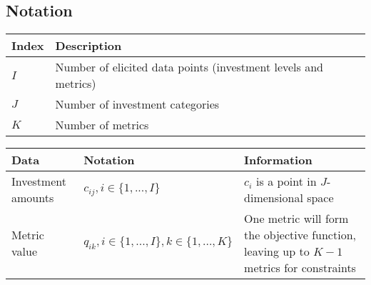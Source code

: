 \documentclass[letterpaper,10pt,english]{sphinxmanual}
\begin{document}
\subsection{Notation}
\label{\detokenize{optimizers:notation}}

\begin{savenotes}\sphinxattablestart
\centering
{}
\sphinxthecaptionisattop
{}\label{\detokenize{optimizers:table-8}}\label{\detokenize{optimizers:tbl-milpindex}}
\sphinxaftertopcaption
\begin{tabulary}{\linewidth}[t]{|T|T|}
\hline
\sphinxstyletheadfamily 
Index
&\sphinxstyletheadfamily 
Description
\\
\hline
\(I\)
&
Number of elicited data points (investment levels and metrics)
\\
\hline
\(J\)
&
Number of investment categories
\\
\hline
\(K\)
&
Number of metrics
\\
\hline
\end{tabulary}
\par
\sphinxattableend\end{savenotes}


\begin{savenotes}\sphinxattablestart
\centering
{}
\sphinxthecaptionisattop
{}\label{\detokenize{optimizers:table-9}}\label{\detokenize{optimizers:tbl-milpdat}}
\sphinxaftertopcaption
\begin{tabulary}{\linewidth}[t]{|T|T|T|}
\hline
\sphinxstyletheadfamily 
Data
&\sphinxstyletheadfamily 
Notation
&\sphinxstyletheadfamily 
Information
\\
\hline
Investment amounts
&
\(c_{ij}, i \in \{1, ..., I\}\)
&
\(c_i\) is a point in \(J\)-dimensional space
\\
\hline
Metric value
&
\(q_{ik}, i \in \{1, ..., I \}, k \in \{1, ..., K \}\)
&
One metric will form the objective function, leaving up to \(K-1\) metrics for constraints
\\
\hline
\end{tabulary}
\par
\sphinxattableend\end{savenotes}
\end{document}

